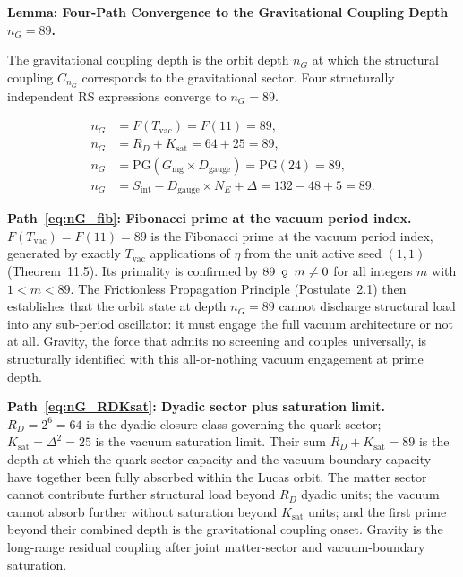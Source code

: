 \documentclass[11pt, letterpaper]{article}
\newcommand{\koppa}{\mathbin{\text{\rm\k{o}}}}
\theoremstyle{definition}
\theoremstyle{plain}
\begin{document}
\begin{rsbox}
\textbf{Lemma: Four-Path Convergence to the Gravitational Coupling Depth $n_G = 89$.}

The gravitational coupling depth is the orbit depth $n_G$ at which the structural
coupling $C_{n_G}$ corresponds to the gravitational sector. Four structurally
independent RS expressions converge to $n_G = 89$.

\begin{align}
    n_G &= F(T_\mathrm{vac}) = F(11) = 89, \label{eq:nG_fib}\\
    n_G &= R_D + K_\mathrm{sat} = 64 + 25 = 89, \label{eq:nG_RDKsat}\\
    n_G &= \mathrm{PG}(G_\mathrm{mg} \times D_\mathrm{gauge}) = \mathrm{PG}(24) = 89, \label{eq:nG_PG}\\
    n_G &= S_\mathrm{int} - D_\mathrm{gauge} \times N_E + \Delta = 132 - 48 + 5 = 89. \label{eq:nG_Sint}
\end{align}

\textbf{Path~\eqref{eq:nG_fib}: Fibonacci prime at the vacuum period index.}
$F(T_\mathrm{vac}) = F(11) = 89$ is the Fibonacci prime at the vacuum period index,
generated by exactly $T_\mathrm{vac}$ applications of $\eta$ from the unit active seed $(1,1)$
(Theorem~11.5). Its primality is confirmed by $89 \;\mathbin{\koppa}\; m \neq 0$ for
all integers $m$ with $1 < m < 89$. The Frictionless Propagation Principle
(Postulate~2.1) then establishes that the orbit state at depth $n_G = 89$ cannot
discharge structural load into any sub-period oscillator: it must engage the full
vacuum architecture or not at all. Gravity, the force that admits no screening
and couples universally, is structurally identified with this all-or-nothing
vacuum engagement at prime depth.

\textbf{Path~\eqref{eq:nG_RDKsat}: Dyadic sector plus saturation limit.}
$R_D = 2^6 = 64$ is the dyadic closure class governing the quark sector;
$K_\mathrm{sat} = \Delta^2 = 25$ is the vacuum saturation limit. Their sum
$R_D + K_\mathrm{sat} = 89$ is the depth at which the quark sector capacity
and the vacuum boundary capacity have together been fully absorbed within the
Lucas orbit. The matter sector cannot contribute further structural load beyond
$R_D$ dyadic units; the vacuum cannot absorb further without saturation beyond
$K_\mathrm{sat}$ units; and the first prime beyond their combined depth is the
gravitational coupling onset. Gravity is the long-range residual coupling after
joint matter-sector and vacuum-boundary saturation.


\end{rsbox}
\end{document}
